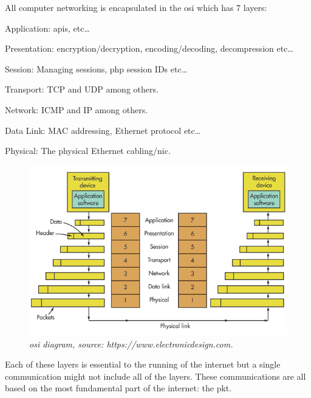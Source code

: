 \documentclass[titlepage]{article}
\begin{document}
All computer networking is encapsulated in the \gls{osi} which has 7 layers:

\begin{etaremune}
  \item{Application: \gls{api}s, etc\ldots}
  \item{Presentation: encryption/decryption, encoding/decoding, decompression etc\ldots}
  \item{Session: Managing sessions, \gls{php} session IDs etc\ldots}
  \item{Transport: TCP and UDP among others.}
  \item{Network: ICMP and IP among others.}
  \item{Data Link: MAC addressing, Ethernet protocol etc\ldots}
  \item{Physical: The physical Ethernet cabling/\gls{nic}.}
\end{etaremune}

\begin{figure}[H]
  \centering
  \includegraphics[width=\textwidth]{osi_model.png}
    \caption{\textit{%
    \gls{osi} diagram, source: https://www.electronicdesign.com.
}}\label{osi_model}
\end{figure}
Each of these layers is essential to the running of the internet but a single communication might 
not include all of the layers. These communications are all based on the most fundamental part of 
the internet: the \gls{pkt}. 
\end{document}
